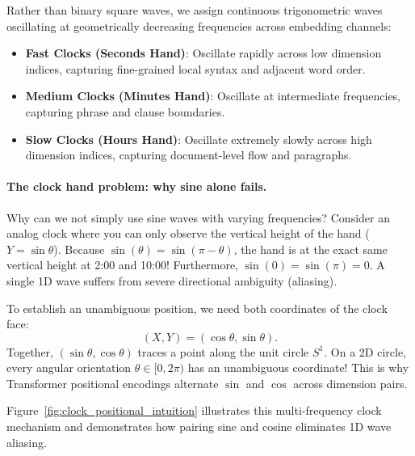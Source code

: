\documentclass[../../main.tex]{subfiles}
\begin{document}
Rather than binary square waves, we assign continuous trigonometric waves oscillating at geometrically decreasing frequencies across embedding channels:
\begin{itemize}
    \item \textbf{Fast Clocks (Seconds Hand)}: Oscillate rapidly across low dimension indices, capturing fine-grained local syntax and adjacent word order.
    \item \textbf{Medium Clocks (Minutes Hand)}: Oscillate at intermediate frequencies, capturing phrase and clause boundaries.
    \item \textbf{Slow Clocks (Hours Hand)}: Oscillate extremely slowly across high dimension indices, capturing document-level flow and paragraphs.
\end{itemize}

\paragraph{The clock hand problem: why sine alone fails.}
Why can we not simply use sine waves with varying frequencies?
Consider an analog clock where you can only observe the vertical height of the hand ($Y = \sin \theta$). Because $\sin(\theta) = \sin(\pi - \theta)$, the hand is at the exact same vertical height at 2:00 and 10:00! Furthermore, $\sin(0) = \sin(\pi) = 0$. A single 1D wave suffers from severe directional ambiguity (aliasing).

To establish an unambiguous position, we need both coordinates of the clock face:
\begin{equation}
(X, Y) = (\cos \theta, \sin \theta).
\end{equation}
Together, $(\sin \theta, \cos \theta)$ traces a point along the unit circle $S^1$. On a 2D circle, every angular orientation $\theta \in [0, 2\pi)$ has an unambiguous coordinate! This is why Transformer positional encodings alternate $\sin$ and $\cos$ across dimension pairs.

Figure~\ref{fig:clock_positional_intuition} illustrates this multi-frequency clock mechanism and demonstrates how pairing sine and cosine eliminates 1D wave aliasing.
\end{document}
